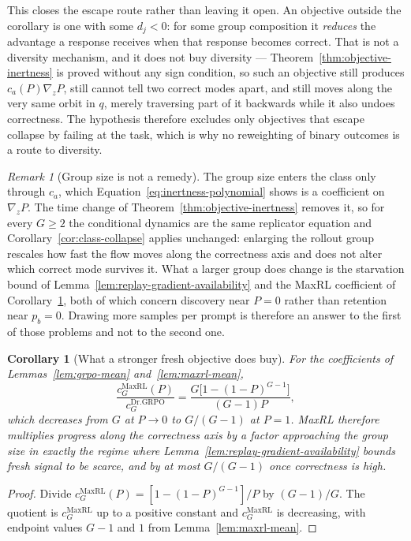 \documentclass{article}
\newcommand{\1}{\mathbf 1}
\newtheorem{corollary}[lemma]{Corollary}
\theoremstyle{remark}
\newtheorem{remark}[lemma]{Remark}
\theoremstyle{definition}
\theoremstyle{plain}
\begin{document}
This closes the escape route rather than leaving it open. An objective outside
the corollary is one with some $d_j<0$: for some group composition it
\emph{reduces} the advantage a response receives when that response becomes
correct. That is not a diversity mechanism, and it does not buy diversity ---
Theorem~\ref{thm:objective-inertness} is proved without any sign condition, so
such an objective still produces $c_a(P)\nabla_zP$, still cannot tell two
correct modes apart, and still moves along the very same orbit in $q$, merely
traversing part of it backwards while it also undoes correctness. The
hypothesis therefore excludes only objectives that escape collapse by failing
at the task, which is why no reweighting of binary outcomes is a route to
diversity.

\begin{remark}[Group size is not a remedy]
\label{rem:group-size-inert}
The group size enters the class only through $c_a$, which
Equation~\eqref{eq:inertness-polynomial} shows is a coefficient on
$\nabla_zP$. The time change of Theorem~\ref{thm:objective-inertness} removes
it, so for every $G\ge2$ the conditional dynamics are the same replicator
equation and Corollary~\ref{cor:class-collapse} applies unchanged: enlarging
the rollout group rescales how fast the flow moves along the correctness axis
and does not alter which correct mode survives it. What a larger group does
change is the starvation bound of
Lemma~\ref{lem:replay-gradient-availability} and the MaxRL coefficient of
Corollary~\ref{cor:maxrl-starvation}, both of which concern discovery near
$P=0$ rather than retention near $p_b=0$. Drawing more samples per prompt is
therefore an answer to the first of those problems and not to the second one.
\end{remark}

\begin{corollary}[What a stronger fresh objective does buy]
\label{cor:maxrl-starvation}
For the coefficients of Lemmas~\ref{lem:grpo-mean} and~\ref{lem:maxrl-mean},
\[
 \frac{c_G^{\mathrm{MaxRL}}(P)}{c_G^{\mathrm{Dr.GRPO}}}
 =\frac{G\big[1-(1-P)^{G-1}\big]}{(G-1)P},
\]
which decreases from $G$ at $P\to0$ to $G/(G-1)$ at $P=1$. MaxRL therefore
multiplies progress along the correctness axis by a factor approaching the
group size in exactly the regime where
Lemma~\ref{lem:replay-gradient-availability} bounds fresh signal to be scarce,
and by at most $G/(G-1)$ once correctness is high.
\end{corollary}

\begin{proof}
Divide $c_G^{\mathrm{MaxRL}}(P)=[1-(1-P)^{G-1}]/P$ by $(G-1)/G$. The quotient
is $c_G^{\mathrm{MaxRL}}$ up to a positive constant and
$c_G^{\mathrm{MaxRL}}$ is decreasing, with endpoint values $G-1$ and $1$ from
Lemma~\ref{lem:maxrl-mean}.
\end{proof}
\end{document}
